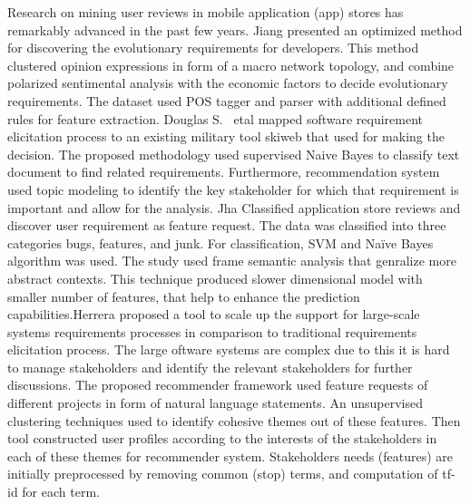 Research on mining user reviews in mobile application (app) stores has
remarkably advanced in the past few years. Jiang \etal \cite{Jiang:2014}
presented an optimized method for discovering the evolutionary requirements for
developers. This method clustered opinion expressions in form of a macro network
topology, and combine polarized sentimental analysis with the economic factors
to decide evolutionary requirements. The dataset used POS tagger and parser with
additional defined rules for feature extraction. Douglas S. ~etal
\cite{Douglas:S2008} mapped software requirement elicitation process to an
existing military tool skiweb that used for making the decision. The proposed
methodology used supervised Naive Bayes to classify text document to find
related requirements. Furthermore, recommendation system used topic modeling to
identify the key stakeholder for which that requirement is important and allow
for the analysis. Jha \etal \cite{Jha:2017} Classified application store reviews
and discover user requirement as feature request. The data was classified into
three categories bugs, features, and junk. For classification, SVM and Naïve
Bayes algorithm was used. The study used frame semantic analysis that genralize more abstract contexts. This technique produced slower dimensional model
with smaller number of features, that help to enhance the prediction capabilities.Herrera\etal \cite{Castro-Herrera:2009} proposed a tool to scale up the support 
for large-scale systems requirements processes in comparison to traditional requirements elicitation process. The large oftware systems are complex due to this 
it is hard to manage stakeholders and identify the relevant stakeholders for further discussions.
The proposed recommender framework used feature requests of different projects in form of natural language statements. 
An unsupervised clustering techniques used to identify cohesive themes out of these features. Then tool constructed user
profiles according to the interests of the stakeholders in each of these themes for recommender system. Stakeholders needs (features) are initially preprocessed by
removing common (stop) terms, and computation of tf-id for each term. \\



